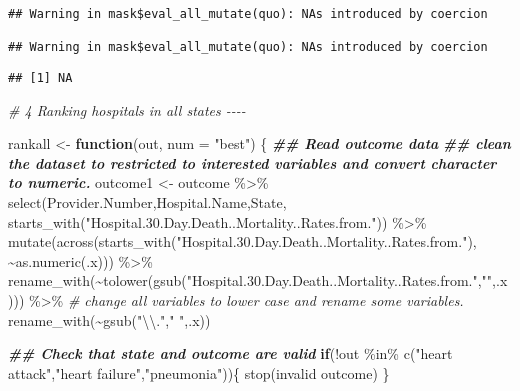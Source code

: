 \documentclass[
]{article}
\newenvironment{Shaded}{\begin{snugshade}}{\end{snugshade}}
\newcommand{\AttributeTok}[1]{\textcolor[rgb]{0.77,0.63,0.00}{#1}}
\newcommand{\CommentTok}[1]{\textcolor[rgb]{0.56,0.35,0.01}{\textit{#1}}}
\newcommand{\ControlFlowTok}[1]{\textcolor[rgb]{0.13,0.29,0.53}{\textbf{#1}}}
\newcommand{\DocumentationTok}[1]{\textcolor[rgb]{0.56,0.35,0.01}{\textbf{\textit{#1}}}}
\newcommand{\FunctionTok}[1]{\textcolor[rgb]{0.00,0.00,0.00}{#1}}
\newcommand{\NormalTok}[1]{#1}
\newcommand{\OtherTok}[1]{\textcolor[rgb]{0.56,0.35,0.01}{#1}}
\newcommand{\SpecialCharTok}[1]{\textcolor[rgb]{0.00,0.00,0.00}{#1}}
\newcommand{\StringTok}[1]{\textcolor[rgb]{0.31,0.60,0.02}{#1}}
\begin{document}
\begin{verbatim}
## Warning in mask$eval_all_mutate(quo): NAs introduced by coercion

## Warning in mask$eval_all_mutate(quo): NAs introduced by coercion
\end{verbatim}

\begin{verbatim}
## [1] NA
\end{verbatim}

\begin{Shaded}
\begin{Highlighting}[]
\CommentTok{\# 4 Ranking hospitals in all states {-}{-}{-}{-}}

\NormalTok{rankall }\OtherTok{\textless{}{-}} \ControlFlowTok{function}\NormalTok{(out, }\AttributeTok{num =} \StringTok{"best"}\NormalTok{) \{}
  \DocumentationTok{\#\# Read outcome data}
  \DocumentationTok{\#\# clean the dataset to restricted to interested variables and convert character to numeric.}
\NormalTok{            outcome1 }\OtherTok{\textless{}{-}}\NormalTok{ outcome }\SpecialCharTok{\%\textgreater{}\%}
              \FunctionTok{select}\NormalTok{(Provider.Number,Hospital.Name,State, }\FunctionTok{starts\_with}\NormalTok{(}\StringTok{"Hospital.30.Day.Death..Mortality..Rates.from."}\NormalTok{)) }\SpecialCharTok{\%\textgreater{}\%}
              \FunctionTok{mutate}\NormalTok{(}\FunctionTok{across}\NormalTok{(}\FunctionTok{starts\_with}\NormalTok{(}\StringTok{"Hospital.30.Day.Death..Mortality..Rates.from."}\NormalTok{), }\SpecialCharTok{\textasciitilde{}}\FunctionTok{as.numeric}\NormalTok{(.x))) }\SpecialCharTok{\%\textgreater{}\%}
              \FunctionTok{rename\_with}\NormalTok{(}\SpecialCharTok{\textasciitilde{}}\FunctionTok{tolower}\NormalTok{(}\FunctionTok{gsub}\NormalTok{(}\StringTok{"Hospital.30.Day.Death..Mortality..Rates.from."}\NormalTok{,}\StringTok{""}\NormalTok{,.x))) }\SpecialCharTok{\%\textgreater{}\%} \CommentTok{\# change all variables to lower case and rename some variables.}
              \FunctionTok{rename\_with}\NormalTok{(}\SpecialCharTok{\textasciitilde{}}\FunctionTok{gsub}\NormalTok{(}\StringTok{"}\SpecialCharTok{\textbackslash{}\textbackslash{}}\StringTok{."}\NormalTok{,}\StringTok{" "}\NormalTok{,.x))}

  \DocumentationTok{\#\# Check that state and outcome are valid}
              \ControlFlowTok{if}\NormalTok{(}\SpecialCharTok{!}\NormalTok{out }\SpecialCharTok{\%in\%} \FunctionTok{c}\NormalTok{(}\StringTok{"heart attack"}\NormalTok{,}\StringTok{"heart failure"}\NormalTok{,}\StringTok{"pneumonia"}\NormalTok{))\{}
                \FunctionTok{stop}\NormalTok{(}\StringTok{\textquotesingle{}invalid outcome\textquotesingle{}}\NormalTok{)}
\NormalTok{              \}}


\end{Highlighting}
\end{Shaded}
\end{document}
